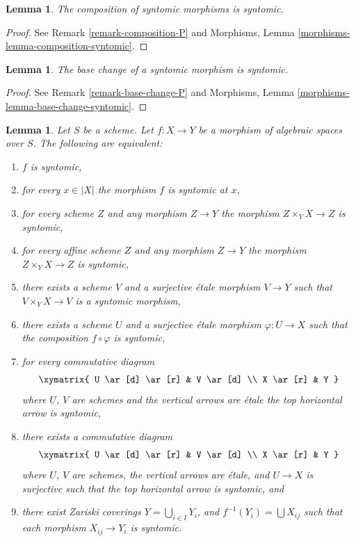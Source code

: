 \documentclass{stacks-project}
\theoremstyle{plain}
\newtheorem{lemma}[subsection]{Lemma}
\theoremstyle{definition}
\theoremstyle{remark}
\numberwithin{equation}{subsection}
\begin{document}
\begin{lemma}
\label{lemma-composition-syntomic}
The composition of syntomic morphisms is syntomic.
\end{lemma}

\begin{proof}
See Remark \ref{remark-composition-P} and
Morphisms, Lemma \ref{morphisms-lemma-composition-syntomic}.
\end{proof}

\begin{lemma}
\label{lemma-base-change-syntomic}
The base change of a syntomic morphism is syntomic.
\end{lemma}

\begin{proof}
See Remark \ref{remark-base-change-P} and
Morphisms, Lemma \ref{morphisms-lemma-base-change-syntomic}.
\end{proof}

\begin{lemma}
\label{lemma-syntomic-local}
Let $S$ be a scheme.
Let $f : X \to Y$ be a morphism of algebraic spaces over $S$.
The following are equivalent:
\begin{enumerate}
\item $f$ is syntomic,
\item for every $x \in |X|$ the morphism $f$ is syntomic at $x$,
\item for every scheme $Z$ and any morphism $Z \to Y$ the morphism
$Z \times_Y X \to Z$ is syntomic,
\item for every affine scheme $Z$ and any morphism
$Z \to Y$ the morphism $Z \times_Y X \to Z$ is syntomic,
\item there exists a scheme $V$ and a surjective \'etale morphism
$V \to Y$ such that $V \times_Y X \to V$ is a syntomic morphism,
\item there exists a scheme $U$ and a surjective \'etale morphism
$\varphi : U \to X$ such that the composition $f \circ \varphi$
is syntomic,
\item for every commutative diagram
$$
\xymatrix{
U \ar[d] \ar[r] & V \ar[d] \\
X \ar[r] & Y
}
$$
where $U$, $V$ are schemes and the vertical arrows are \'etale
the top horizontal arrow is syntomic,
\item there exists a commutative diagram
$$
\xymatrix{
U \ar[d] \ar[r] & V \ar[d] \\
X \ar[r] & Y
}
$$
where $U$, $V$ are schemes, the vertical arrows are \'etale, and
$U \to X$ is surjective such that the top horizontal arrow is syntomic, and
\item there exist Zariski coverings $Y = \bigcup_{i \in I} Y_i$,
and $f^{-1}(Y_i) = \bigcup X_{ij}$ such that
each morphism $X_{ij} \to Y_i$ is syntomic.
\end{enumerate}
\end{lemma}
\end{document}
